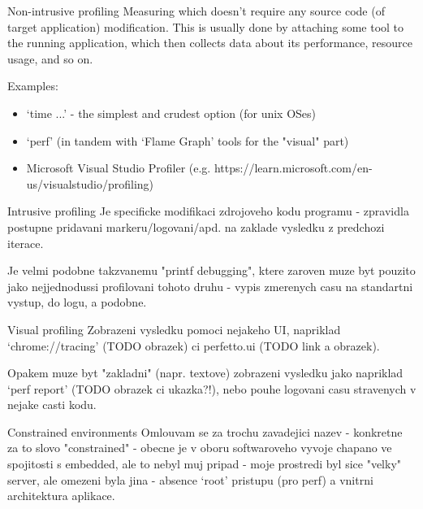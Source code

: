 \documentclass[aspectratio=169]{beamer}
\begin{document}
\begin{frame}{Non-intrusive profiling}
    Measuring which doesn't require any source code (of target application) modification. This is usually done by attaching some tool to the running application, which then collects data about its performance, resource usage, and so on.

    Examples:

    \begin{itemize}
        \item `time ...' - the simplest and crudest option (for unix OSes)
        \item `perf' (in tandem with `Flame Graph' tools for the "visual" part)
        \item Microsoft Visual Studio Profiler (e.g. https://learn.microsoft.com/en-us/visualstudio/profiling)
    \end{itemize}

\end{frame}

\begin{frame}{Intrusive profiling}
    Je specificke modifikaci zdrojoveho kodu programu - zpravidla postupne pridavani markeru/logovani/apd. na zaklade vysledku z predchozi iterace.

    Je velmi podobne takzvanemu "printf debugging", ktere zaroven muze byt pouzito jako nejjednodussi profilovani tohoto druhu - vypis zmerenych casu na standartni vystup, do logu, a podobne.

\end{frame}

\begin{frame}{Visual profiling}
    Zobrazeni vysledku pomoci nejakeho UI, napriklad `chrome://tracing' (TODO obrazek) ci perfetto.ui (TODO link a obrazek).

    Opakem muze byt "zakladni" (napr. textove) zobrazeni vysledku jako napriklad `perf report' (TODO obrazek ci ukazka?!), nebo pouhe logovani casu stravenych v nejake casti kodu.

\end{frame}

\begin{frame}{Constrained environments}
    Omlouvam se za trochu zavadejici nazev - konkretne za to slovo "constrained" - obecne je v oboru softwaroveho vyvoje chapano ve spojitosti s embedded, ale to nebyl muj pripad - moje prostredi byl sice "velky" server, ale omezeni byla jina - absence `root' pristupu (pro perf) a vnitrni architektura aplikace.

\end{frame}
\end{document}
